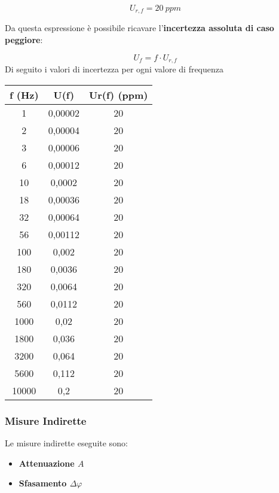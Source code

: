 \[U_{r,f} = 20 \ ppm\]

Da questa espressione è possibile ricavare l'\textbf{incertezza assoluta di caso peggiore}:

\[U_f = f \cdot U_{r,f}\]
Di seguito i valori di incertezza per ogni valore di frequenza 

\begin{table}[!ht]
    \centering
    \begin{tabular}{|c|c|c|}
    \hline
        \textbf{f (Hz)} & \textbf{U(f)} & \textbf{Ur(f) (ppm)} \\ \hline
        1 & 0,00002 & 20 \\ \hline
        2 & 0,00004 & 20 \\ \hline
        3 & 0,00006 & 20 \\ \hline
        6 & 0,00012 & 20 \\ \hline
        10 & 0,0002 & 20 \\ \hline
        18 & 0,00036 & 20 \\ \hline
        32 & 0,00064 & 20 \\ \hline
        56 & 0,00112 & 20 \\ \hline
        100 & 0,002 & 20 \\ \hline
        180 & 0,0036 & 20 \\ \hline
        320 & 0,0064 & 20 \\ \hline
        560 & 0,0112 & 20 \\ \hline
        1000 & 0,02 & 20 \\ \hline
        1800 & 0,036 & 20 \\ \hline
        3200 & 0,064 & 20 \\ \hline
        5600 & 0,112 & 20 \\ \hline
        10000 & 0,2 & 20 \\ \hline
    \end{tabular}
\end{table}

\FloatBarrier
\clearpage

\subsubsection{Misure Indirette}
Le misure indirette eseguite sono:
\begin{itemize}
    \item \textbf{Attenuazione $A$}
    \item \textbf{Sfasamento $\Delta \varphi$}
\end{itemize}

